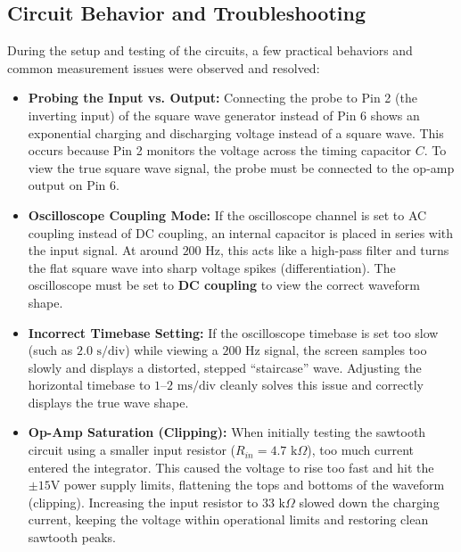 \documentclass[11pt,a4paper]{article}
\begin{document}
\subsection{Circuit Behavior and Troubleshooting}
During the setup and testing of the circuits, a few practical behaviors and common measurement issues were observed and resolved:

\begin{itemize}
    \item \textbf{Probing the Input vs. Output:} Connecting the probe to Pin 2 (the inverting input) of the square wave generator instead of Pin 6 shows an exponential charging and discharging voltage instead of a square wave. This occurs because Pin 2 monitors the voltage across the timing capacitor $C$. To view the true square wave signal, the probe must be connected to the op-amp output on Pin 6.
    
    \item \textbf{Oscilloscope Coupling Mode:} If the oscilloscope channel is set to AC coupling instead of DC coupling, an internal capacitor is placed in series with the input signal. At around $200\text{ Hz}$, this acts like a high-pass filter and turns the flat square wave into sharp voltage spikes (differentiation). The oscilloscope must be set to \textbf{DC coupling} to view the correct waveform shape.
    
    \item \textbf{Incorrect Timebase Setting:} If the oscilloscope timebase is set too slow (such as $2.0\text{ s/div}$) while viewing a $200\text{ Hz}$ signal, the screen samples too slowly and displays a distorted, stepped ``staircase'' wave. Adjusting the horizontal timebase to $1\text{--}2\text{ ms/div}$ cleanly solves this issue and correctly displays the true wave shape.
    
    \item \textbf{Op-Amp Saturation (Clipping):} When initially testing the sawtooth circuit using a smaller input resistor ($R_{in} = 4.7\text{ k}\Omega$), too much current entered the integrator. This caused the voltage to rise too fast and hit the $\pm 15\text{V}$ power supply limits, flattening the tops and bottoms of the waveform (clipping). Increasing the input resistor to $33\text{ k}\Omega$ slowed down the charging current, keeping the voltage within operational limits and restoring clean sawtooth peaks.
\end{itemize}

\end{document}
